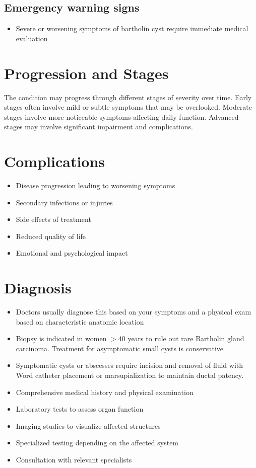 \subsection{Emergency warning signs}
\begin{itemize}[noitemsep]
  \item Severe or worsening symptoms of bartholin cyst require immediate medical evaluation
\end{itemize}
\section{Progression and Stages}
The condition may progress through different stages of severity over time. Early stages often involve mild or subtle symptoms that may be overlooked. Moderate stages involve more noticeable symptoms affecting daily function. Advanced stages may involve significant impairment and complications.
\section{Complications}
\begin{itemize}[noitemsep]
  \item Disease progression leading to worsening symptoms
  \item Secondary infections or injuries
  \item Side effects of treatment
  \item Reduced quality of life
  \item Emotional and psychological impact
\end{itemize}
\section{Diagnosis}
\begin{itemize}[noitemsep]
  \item Doctors usually diagnose this based on your symptoms and a physical exam based on characteristic anatomic location
  \item Biopsy is indicated in women $>40$ years to rule out rare Bartholin gland carcinoma. Treatment for asymptomatic small cysts is conservative
  \item Symptomatic cysts or abscesses require incision and removal of fluid with Word catheter placement or marsupialization to maintain ductal patency.
  \item Comprehensive medical history and physical examination
  \item Laboratory tests to assess organ function
  \item Imaging studies to visualize affected structures
  \item Specialized testing depending on the affected system
  \item Consultation with relevant specialists
\end{itemize}
